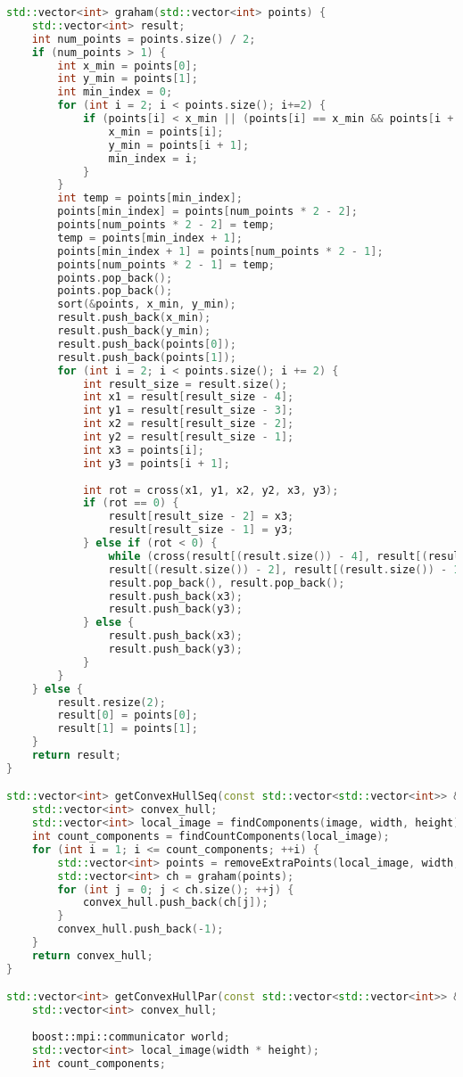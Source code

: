 \documentclass[a4paper, 12pt]{extarticle}
\begin{document}
\begin{lstlisting}[language=C++]
std::vector<int> graham(std::vector<int> points) {
	std::vector<int> result;
	int num_points = points.size() / 2;
	if (num_points > 1) {
		int x_min = points[0];
		int y_min = points[1];
		int min_index = 0;
		for (int i = 2; i < points.size(); i+=2) {
			if (points[i] < x_min || (points[i] == x_min && points[i + 1] < y_min)) {
				x_min = points[i];
				y_min = points[i + 1];
				min_index = i;
			}
		}
		int temp = points[min_index];
		points[min_index] = points[num_points * 2 - 2];
		points[num_points * 2 - 2] = temp;
		temp = points[min_index + 1];
		points[min_index + 1] = points[num_points * 2 - 1];
		points[num_points * 2 - 1] = temp;
		points.pop_back();
		points.pop_back();
		sort(&points, x_min, y_min);
		result.push_back(x_min);
		result.push_back(y_min);
		result.push_back(points[0]);
		result.push_back(points[1]);
		for (int i = 2; i < points.size(); i += 2) {
			int result_size = result.size();
			int x1 = result[result_size - 4];
			int y1 = result[result_size - 3];
			int x2 = result[result_size - 2];
			int y2 = result[result_size - 1];
			int x3 = points[i];
			int y3 = points[i + 1];
			
			int rot = cross(x1, y1, x2, y2, x3, y3);
			if (rot == 0) {
				result[result_size - 2] = x3;
				result[result_size - 1] = y3;
			} else if (rot < 0) {
				while (cross(result[(result.size()) - 4], result[(result.size()) - 3],
				result[(result.size()) - 2], result[(result.size()) - 1], x3, y3) < 0)
				result.pop_back(), result.pop_back();
				result.push_back(x3);
				result.push_back(y3);
			} else {
				result.push_back(x3);
				result.push_back(y3);
			}
		}
	} else {
		result.resize(2);
		result[0] = points[0];
		result[1] = points[1];
	}
	return result;
}

std::vector<int> getConvexHullSeq(const std::vector<std::vector<int>> &image, int width, int height) {
	std::vector<int> convex_hull;
	std::vector<int> local_image = findComponents(image, width, height);
	int count_components = findCountComponents(local_image);
	for (int i = 1; i <= count_components; ++i) {
		std::vector<int> points = removeExtraPoints(local_image, width, height, i);
		std::vector<int> ch = graham(points);
		for (int j = 0; j < ch.size(); ++j) {
			convex_hull.push_back(ch[j]);
		}
		convex_hull.push_back(-1);
	}
	return convex_hull;
}

std::vector<int> getConvexHullPar(const std::vector<std::vector<int>> &image, int width, int height) {
	std::vector<int> convex_hull;
	
	boost::mpi::communicator world;
	std::vector<int> local_image(width * height);
	int count_components;
	

\end{lstlisting}
\end{document}
